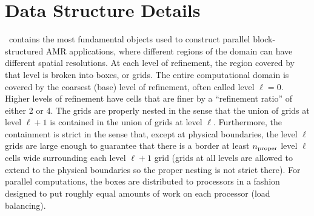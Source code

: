 \section{Data Structure Details}

\BoxLib\ contains the most fundamental objects used to construct parallel
block-structured AMR applications, where different regions of the domain 
can have different spatial resolutions. 
At each level of refinement, the region covered by that level is broken
into boxes, or grids.  The entire computational domain is covered by
the coarsest (base) level of refinement, often called level $\ell=0$. 
Higher levels of refinement have cells that are finer by a ``refinement ratio''
of either 2 or 4.  The grids are properly nested in the sense that the union 
of grids at level $\ell+1$ is contained in the union of grids at level $\ell$.
Furthermore, the containment is strict in the sense that, except at physical 
boundaries, the level $\ell$ grids are large enough to guarantee that there is
a border at least $n_{\rm proper}$ level $\ell$ cells wide surrounding each level
$\ell +1$ grid (grids at all levels are allowed to extend to the physical
boundaries so the proper nesting is not strict there).
For parallel computations, the boxes are distributed to processors in
a fashion designed to put roughly equal amounts of work on each
processor (load balancing).

